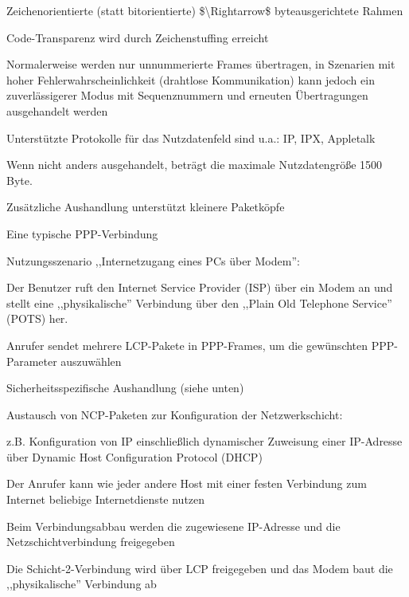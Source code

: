 \documentclass[a4paper]{article}
\begin{document}
\begin{multicols}{3}
      \begin{itemize*}
            \item Zeichenorientierte (statt bitorientierte)
            \$\textbackslash Rightarrow\$ byteausgerichtete Rahmen
            \item Code-Transparenz wird durch Zeichenstuffing erreicht
            \item Normalerweise werden nur unnummerierte Frames übertragen, in Szenarien
            mit hoher Fehlerwahrscheinlichkeit (drahtlose Kommunikation) kann
            jedoch ein zuverlässigerer Modus mit Sequenznummern und erneuten
            Übertragungen ausgehandelt werden
            \item Unterstützte Protokolle für das Nutzdatenfeld sind u.a.: IP, IPX,
            Appletalk
            \item Wenn nicht anders ausgehandelt, beträgt die maximale Nutzdatengröße
            1500 Byte.
            \item Zusätzliche Aushandlung unterstützt kleinere Paketköpfe
      \end{itemize*}

      Eine typische PPP-Verbindung

      \begin{itemize*}
            \item Nutzungsszenario ,,Internetzugang eines PCs über Modem'':
            \begin{itemize*}
                  \item Der Benutzer ruft den Internet Service Provider (ISP) über ein Modem an und stellt eine ,,physikalische'' Verbindung über den ,,Plain Old Telephone Service'' (POTS) her.
                  \item Anrufer sendet mehrere LCP-Pakete in PPP-Frames, um die gewünschten PPP-Parameter auszuwählen
                  \item Sicherheitsspezifische Aushandlung (siehe unten)
                  \item Austausch von NCP-Paketen zur Konfiguration der Netzwerkschicht:
                  \begin{itemize*} \item z.B. Konfiguration von IP einschließlich dynamischer Zuweisung einer IP-Adresse über Dynamic Host Configuration Protocol (DHCP) \end{itemize*}
                  \item Der Anrufer kann wie jeder andere Host mit einer festen Verbindung zum Internet beliebige Internetdienste nutzen
                  \item Beim Verbindungsabbau werden die zugewiesene IP-Adresse und die Netzschichtverbindung freigegeben
                  \item Die Schicht-2-Verbindung wird über LCP freigegeben und das Modem baut die ,,physikalische'' Verbindung ab
            \end{itemize*}
      \end{itemize*}


\end{multicols}
\end{document}
